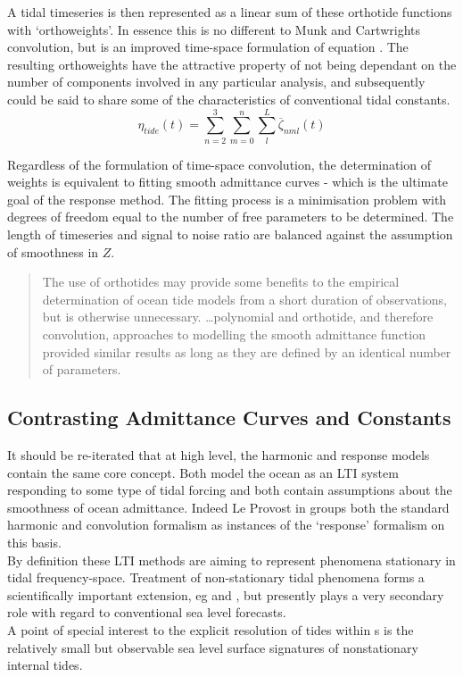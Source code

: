 A tidal timeseries is then represented as a linear sum of these orthotide functions with `orthoweights'. In essence this is no different to Munk and Cartwrights convolution, but is an improved time-space formulation of equation \label{E:Z}.  The resulting orthoweights have the attractive property of not being dependant on the number of components involved in any particular analysis, and subsequently could be said to share some of the characteristics of conventional tidal constants.
\begin{equation}
\label{E:orthosum}
\eta_{tide}(t) = \sum_{n=2}^3 \sum_{m=0}^n \sum_{l}^L \overline{\zeta}_{nml}(t)
\end{equation}

Regardless of the formulation of time-space convolution, the determination of weights is equivalent to fitting smooth admittance curves - which is the ultimate goal of the response method.  The fitting process is a minimisation problem with degrees of freedom equal to the number of free parameters to be determined.    The length of timeseries and signal to noise ratio are balanced against the assumption of smoothness in $Z$.
\begin{quotation}   
The use of orthotides may provide some benefits to the empirical determination of ocean tide models from a short duration of observations, but is otherwise unnecessary. \dots  polynomial and orthotide, and therefore convolution, approaches to modelling the smooth admittance function provided similar results as long as they are defined by an identical number of parameters.\citep{Desai:2006wo}
\end{quotation}



\subsection{Contrasting Admittance Curves and Constants}

It should be re-iterated that at high level, the harmonic and response models contain the same core concept.   Both model the ocean as an LTI system responding to some type of tidal forcing and both contain assumptions about the smoothness of ocean admittance.  Indeed Le Provost in \citep[chpt6]{Fu:2001ub} groups both the standard harmonic and convolution formalism as instances of the `response' formalism on this basis. \\
By definition these LTI methods are aiming to represent phenomena stationary in tidal frequency-space.  Treatment of non-stationary tidal phenomena forms a scientifically important extension, eg \citep{Colosi:2006va} and \citep{Ray:2011tj}, but presently plays a very secondary role with regard to conventional sea level forecasts.\\
A point of special interest to the explicit resolution of tides within \OGCM{}s is the relatively small but observable sea level surface signatures of nonstationary internal tides.




